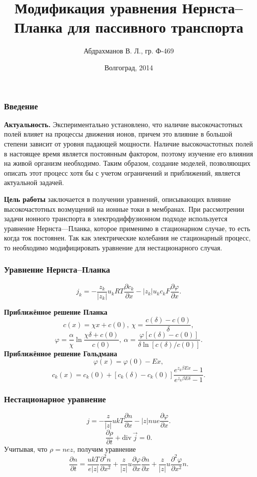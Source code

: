 \documentclass[10pt,pdf]{beamer}
\date{Волгоград, 2014}
\title{Модификация уравнения Нернста--Планка для пассивного транспорта}
\author{Абдрахманов В. Л., гр. Ф-469}
\institute{Руководитель --- профессор, д.ф.-м.н. Шеин А. Г.}
\newcommand{\pder}[2] {\frac{\partial #1}{\partial #2}}
\newcommand{\ppder}[2]{\frac{\partial^2 #1}{\partial {#2}^2}}
\newcommand{\abs}[1]{\left| #1 \right|}
\renewcommand{\phi}{\varphi}
\newcommand{\divergence}{\mathrm{div\,}}
\begin{document}
  \frame{\titlepage}
  \begin{frame}
    \frametitle{Введение}

    \textbf{Актуальность.} Экспериментально установлено, что наличие
    высокочастотных полей влияет на процессы движения ионов, причем это
    влияние в большой степени зависит от уровня падающей мощности.
    Наличие высокочастотных полей в настоящее время является постоянным
    фактором, поэтому изучение его влияния на живой организм необходимо.
    Таким образом, создание моделей, позволяющих описать этот процесс
    хотя бы с учетом ограничений и приближений, является актуальной
    задачей.

    \textbf{Цель работы} заключается в получении уравнений, описывающих
влияние высокочастотных возмущений на ионные токи в мембранах. При
рассмотрении задачи ионного транспорта в электродиффузионном подходе
используется уравнение Нернста—Планка, которое применимо в
стационарном случае, то есть когда ток постоянен. Так как электрические
колебания не стационарный процесс, то необходимо модифицировать
уравнение для нестационарного случая.
\end{frame}
  \begin{frame}
    \frametitle{Уравнение Нернста--Планка}
    \[
        j_k = -\frac{z_k}{\abs{z_k}}u_kRT\pder{c_k}{x} -
        \abs{z_k}u_kc_kF\pder{\phi}{x}.
        \label{eq:nernst-plank}
    \]

      \textbf{Приближённое решение Планка}
      \[
          c(x) = \chi x + c(0),\ \chi = \frac{c(\delta)-c(0)}{\delta},
      \]
      \[
          \phi = \frac{\alpha}{\chi}\ln\frac{\chi\delta + c(0)}{c(0)},
          \ \alpha = \frac{\phi[c(\delta) - c(0)]}
          {\delta\ln[c(\delta) / c(0)]}.
      \]
      \textbf{Приближённое решение Гольдмана}
      \[
          \phi(x) = \phi(0) - Ex,
      \]
      \[
          c_k(x) = c_k(0) + [c_k(\delta) - c_k(0)]
          \frac{e^{z_k\beta Ex} - 1}{e^{z_k\beta E\delta} - 1}.
      \]
  \end{frame}
  \begin{frame}
      \frametitle{Нестационарное уравнение}
        \[
          j = -\frac{z}{|z|}ukT\pder{n}{x} - |z|nue\pder{\phi}{x}.
        \]
        \[
            \pder{\rho}{t} + \divergence\vec{j} = 0.
        \]
        Учитывая, что \( \rho = nez \), получим уравнение
        \[
            \pder{n}{t} = \frac{ukT}{e|z|}\ppder{n}{x} +
            \frac{z}{|z|}u\pder{\phi}{x}\pder{n}{x} +
            \frac{z}{|z|}u\ppder{\phi}{x}n.
        \]
  \end{frame}
\end{document}
